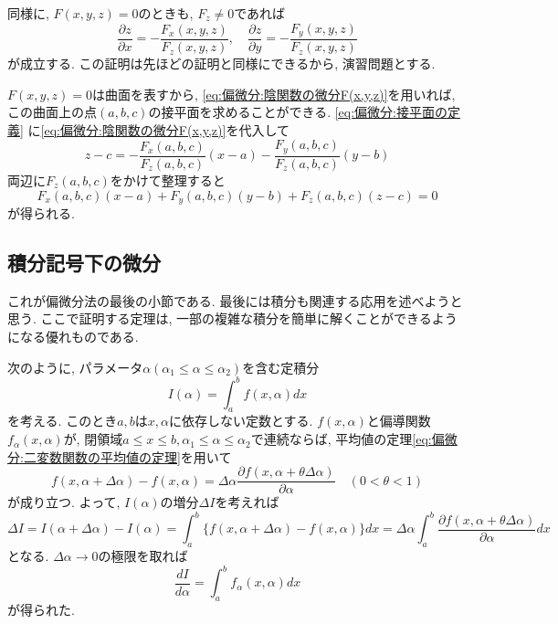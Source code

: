 \documentclass[a4j,dvipdfmx]{jsarticle}
\numberwithin{equation}{section}
\begin{document}
            同様に, $F(x,y,z)=0$のときも, $F_z\neq 0$であれば
            \begin{equation}
                \frac{\partial z}{\partial x} = -\frac{F_{x}(x,y,z)}{F_z(x,y,z)},\quad \frac{\partial z}{\partial y}=-\frac{F_{y}(x,y,z)}{F_{z}(x,y,z)} \label{eq:偏微分:陰関数の微分F(x,y,z)}
            \end{equation}
            が成立する. この証明は先ほどの証明と同様にできるから, 演習問題とする.

            $F(x,y,z)=0$は曲面を表すから, \eqref{eq:偏微分:陰関数の微分F(x,y,z)}を用いれば, この曲面上の点$(a,b,c)$の接平面を求めることができる. \eqref{eq:偏微分:接平面の定義} に\eqref{eq:偏微分:陰関数の微分F(x,y,z)}を代入して
            \begin{equation*}
                z-c=-\frac{F_x(a,b,c)}{F_z(a,b,c)}(x-a)-\frac{F_y(a,b,c)}{F_z(a,b,c)}(y-b)
            \end{equation*}
            両辺に$F_z(a,b,c)$をかけて整理すると
            \begin{equation}
                F_x(a,b,c)(x-a)+F_y(a,b,c)(y-b)+F_z(a,b,c)(z-c)=0 \label{eq:偏微分:陰関数の接平面}
            \end{equation}
            が得られる.
        \clearpage
        \subsection{積分記号下の微分}
            これが偏微分法の最後の小節である. 最後には積分も関連する応用を述べようと思う. ここで証明する定理は, 一部の複雑な積分を簡単に解くことができるようになる優れものである.

            次のように, パラメータ$\alpha (\alpha_1\leq \alpha\leq \alpha_2)$を含む定積分
            \begin{equation}
                I(\alpha)=\int_a^b f(x,\alpha)dx
            \end{equation}
            を考える. このとき$a,b$は$x,\alpha$に依存しない定数とする. $f(x,\alpha)$と偏導関数$f_\alpha(x,\alpha)$が, 閉領域$a\leq x\leq b,\alpha_1\leq \alpha\leq \alpha_2$で連続ならば, 
            平均値の定理\eqref{eq:偏微分:二変数関数の平均値の定理}を用いて
            \begin{equation*}
                f(x,\alpha+\Delta\alpha)-f(x,\alpha)=\Delta\alpha\frac{\partial f(x,\alpha+\theta\Delta\alpha)}{\partial\alpha} \quad (0<\theta<1)
            \end{equation*}
            が成り立つ. よって, $I(\alpha)$の増分$\Delta I$を考えれば
            \begin{equation*}
                \Delta I=I(\alpha+\Delta\alpha)-I(\alpha)=\int_{a}^{b}\{f(x,\alpha+\Delta\alpha)-f(x,\alpha)\}dx=\Delta\alpha\int_{a}^{b}\frac{\partial f(x,\alpha+\theta\Delta\alpha)}{\partial\alpha}dx
            \end{equation*}
            となる. $\Delta\alpha\to 0$の極限を取れば
            \begin{equation}
                \frac{dI}{d\alpha}=\int_{a}^{b} f_{\alpha}(x,\alpha)dx \label{eq:偏微分:積分記号下の微分}
            \end{equation}
            が得られた.\\
\end{document}
